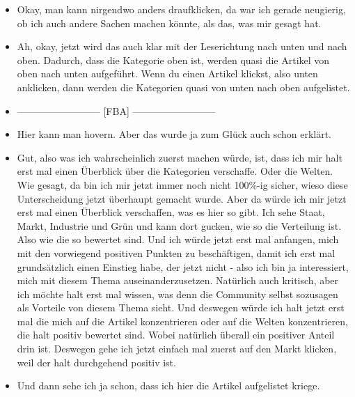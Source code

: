 {\begin{itemize}[]
              Aber ich bin jetzt nicht davor davon abgeschreckt, irgendwo drauf zu klicken, selbst wenn ich den Text jetzt nicht zu 100\% verstehe.
              Aber wie gesagt, also zu 100\% verstehe ich jetzt nicht, was passieren wird.
              Ich denke mir dann, dass ich das gleich einfach sehen werde.
        \item {} Okay, man kann nirgendwo anders draufklicken, da war ich gerade neugierig, ob ich auch andere Sachen machen könnte, als das, was mir gesagt hat.
        \item {} Ah, okay, jetzt wird das auch klar mit der Leserichtung nach unten und nach oben.
              Dadurch, dass die Kategorie oben ist, werden quasi die Artikel von oben nach unten aufgeführt.
              Wenn du einen Artikel klickst, also unten anklicken, dann werden die Kategorien quasi von unten nach oben aufgelistet.
        \item {--------------------------} [FBA] {--------------------------}
        \item {} Hier kann man hovern.
              Aber das wurde ja zum Glück auch schon erklärt.
        \item {} Gut, also was ich wahrscheinlich zuerst machen würde, ist, dass ich mir halt erst mal einen Überblick über die Kategorien verschaffe.
              Oder die Welten.
              Wie gesagt, da bin ich mir jetzt immer noch nicht 100\%-ig sicher, wieso diese Unterscheidung jetzt überhaupt gemacht wurde.
              Aber da würde ich mir jetzt erst mal einen Überblick verschaffen, was es hier so gibt.
              Ich sehe Staat, Markt, Industrie und Grün und kann dort gucken, wie so die Verteilung ist.
              Also wie die so bewertet sind.
              Und ich würde jetzt erst mal anfangen, mich mit den vorwiegend positiven Punkten zu beschäftigen, damit ich erst mal grundsätzlich einen Einstieg habe, der jetzt nicht - also ich bin ja interessiert, mich mit diesem Thema auseinanderzusetzen.
              Natürlich auch kritisch, aber ich möchte halt erst mal wissen, was denn die Community selbst sozusagen als Vorteile von diesem Thema sieht.
              Und deswegen würde ich halt jetzt erst mal die mich auf die Artikel konzentrieren oder auf die Welten konzentrieren, die halt positiv bewertet sind.
              Wobei natürlich überall ein positiver Anteil drin ist.
              Deswegen gehe ich jetzt einfach mal zuerst auf den Markt klicken, weil der halt durchgehend positiv ist.
        \item {} Und dann sehe ich ja schon, dass ich hier die Artikel aufgelistet kriege.

\end{itemize}}
